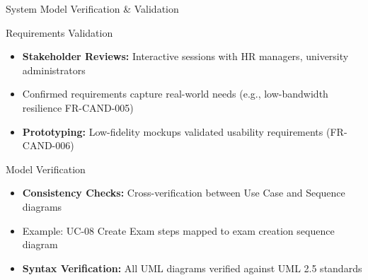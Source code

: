 \begin{frame}{System Model Verification \& Validation}
    \begin{block}{Requirements Validation}
        \begin{itemize}
            \item \textbf{Stakeholder Reviews:} Interactive sessions with HR managers, university administrators
            \item Confirmed requirements capture real-world needs (e.g., low-bandwidth resilience FR-CAND-005)
            \item \textbf{Prototyping:} Low-fidelity mockups validated usability requirements (FR-CAND-006)
        \end{itemize}
    \end{block}
    
    \begin{block}{Model Verification}
        \begin{itemize}
            \item \textbf{Consistency Checks:} Cross-verification between Use Case and Sequence diagrams
            \item Example: UC-08 Create Exam steps mapped to exam creation sequence diagram
            \item \textbf{Syntax Verification:} All UML diagrams verified against UML 2.5 standards
        \end{itemize}
    \end{block}
\end{frame}


